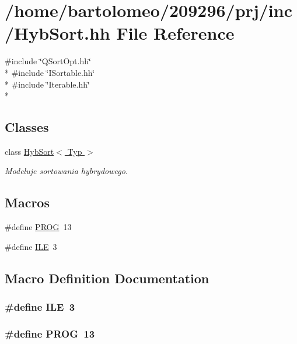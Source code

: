 \hypertarget{_hyb_sort_8hh}{\section{/home/bartolomeo/209296/prj/inc/\-Hyb\-Sort.hh File Reference}
\label{_hyb_sort_8hh}
}
{\ttfamily \#include \char`\"{}Q\-Sort\-Opt.\-hh\char`\"{}}\\*
{\ttfamily \#include \char`\"{}I\-Sortable.\-hh\char`\"{}}\\*
{\ttfamily \#include \char`\"{}Iterable.\-hh\char`\"{}}\\*
\subsection*{Classes}
\begin{DoxyCompactItemize}
\item 
class \hyperlink{class_hyb_sort}{Hyb\-Sort$<$ Typ $>$}
\begin{DoxyCompactList}\small\item\em Modeluje sortowania hybrydowego. \end{DoxyCompactList}\end{DoxyCompactItemize}
\subsection*{Macros}
\begin{DoxyCompactItemize}
\item 
\#define \hyperlink{_hyb_sort_8hh_a60a12235056da679c8976cec1faa66e2}{P\-R\-O\-G}~13
\item 
\#define \hyperlink{_hyb_sort_8hh_aa59719977f35b96c6798e939300c0a8f}{I\-L\-E}~3
\end{DoxyCompactItemize}


\subsection{Macro Definition Documentation}
\hypertarget{_hyb_sort_8hh_aa59719977f35b96c6798e939300c0a8f}{
\subsubsection[{I\-L\-E}]{\setlength{\rightskip}{0pt plus 5cm}\#define I\-L\-E~3}}\label{_hyb_sort_8hh_aa59719977f35b96c6798e939300c0a8f}
\hypertarget{_hyb_sort_8hh_a60a12235056da679c8976cec1faa66e2}{
\subsubsection[{P\-R\-O\-G}]{\setlength{\rightskip}{0pt plus 5cm}\#define P\-R\-O\-G~13}}\label{_hyb_sort_8hh_a60a12235056da679c8976cec1faa66e2}
